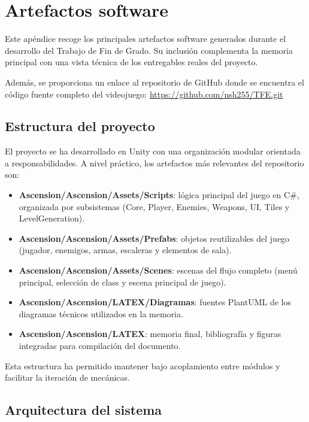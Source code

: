 \appendix
\chapter{Artefactos software}

Este apéndice recoge los principales artefactos software generados durante el desarrollo del Trabajo de Fin de Grado. Su inclusión complementa la memoria principal con una vista técnica de los entregables reales del proyecto.

Además, se proporciona un enlace al repositorio de GitHub donde se encuentra el código fuente completo del videojuego: \url{https://github.com/nsh255/TFE.git}

\section{Estructura del proyecto}

El proyecto se ha desarrollado en Unity con una organización modular orientada a responsabilidades. A nivel práctico, los artefactos más relevantes del repositorio son:

\begin{itemize}
    \item \textbf{Ascension/Ascension/Assets/Scripts}: lógica principal del juego en C\#, organizada por subsistemas (Core, Player, Enemies, Weapons, UI, Tiles y LevelGeneration).
    \item \textbf{Ascension/Ascension/Assets/Prefabs}: objetos reutilizables del juego (jugador, enemigos, armas, escaleras y elementos de sala).
    \item \textbf{Ascension/Ascension/Assets/Scenes}: escenas del flujo completo (menú principal, selección de class y escena principal de juego).
    \item \textbf{Ascension/Ascension/LATEX/Diagramas}: fuentes PlantUML de los diagramas técnicos utilizados en la memoria.
    \item \textbf{Ascension/Ascension/LATEX}: memoria final, bibliografía y figuras integradas para compilación del documento.
\end{itemize}

Esta estructura ha permitido mantener bajo acoplamiento entre módulos y facilitar la iteración de mecánicas.

\section{Arquitectura del sistema}

